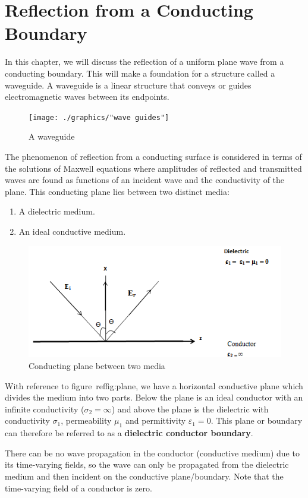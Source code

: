 \chapter{Reflection from a Conducting Boundary}
In this chapter, we will discuss the reflection of a uniform plane wave from a conducting boundary. This will make a foundation for a structure called a waveguide. A waveguide is a linear structure that conveys or guides electromagnetic waves between its endpoints.
\begin{figure}[h]
\centering
\texttt{[image: ./graphics/"wave guides"]}
\caption{A waveguide}
\end{figure}
The phenomenon of reflection from a conducting surface is considered in terms of the solutions of Maxwell equations where amplitudes of reflected and transmitted waves are found as functions of an incident wave and the conductivity of the plane. This conducting plane lies between two distinct media: 
\begin{enumerate}
\item A dielectric medium.
\item An ideal conductive medium.
\end{enumerate}
\begin{figure}[h]
\centering
\includegraphics[width=1\linewidth]{./graphics/plane}
\caption{Conducting plane between two media}
\label{fig:plane}
\end{figure}
With reference to figure~ref{fig:plane}, we have a horizontal conductive plane which divides the medium into two parts. Below the plane is an ideal conductor with an infinite conductivity ($\sigma _2 =\infty$) and above the plane is the dielectric with conductivity $\sigma_1$, permeability $\mu _1$ and	permittivity $ \varepsilon _1 = 0 $. This plane or boundary can therefore be referred to as a \textbf{dielectric conductor boundary}.
 
There can be no wave propagation in the conductor (conductive medium) due to its time-varying fields, so the wave can only be propagated from the dielectric medium and then incident on the conductive plane/boundary. Note that the time-varying field of a conductor is zero.

